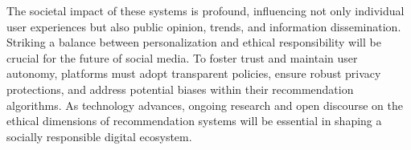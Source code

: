 \documentclass[10pt,twocolumn,twoside,a4paper]{report} %
\begin{document}
The societal impact of these systems is profound, influencing not only individual user experiences but also public opinion, trends, and information dissemination. Striking a balance between personalization and ethical responsibility will be crucial for the future of social media. To foster trust and maintain user autonomy, platforms must adopt transparent policies, ensure robust privacy protections, and address potential biases within their recommendation algorithms. As technology advances, ongoing research and open discourse on the ethical dimensions of recommendation systems will be essential in shaping a socially responsible digital ecosystem.


\nocite{*}

\end{document}
